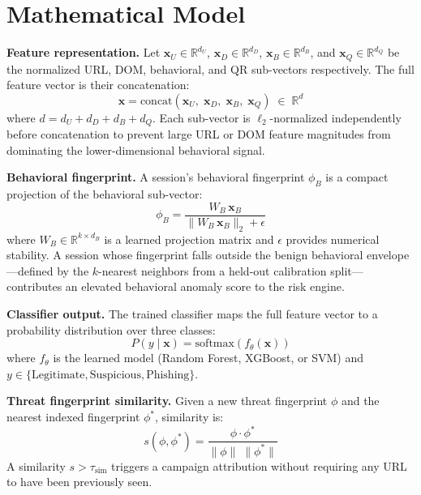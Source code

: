 \documentclass[conference]{IEEEtran}
\begin{document}
\section{Mathematical Model}

\noindent\textbf{Feature representation.}
Let $\mathbf{x}_U\in\mathbb{R}^{d_U}$, $\mathbf{x}_D\in\mathbb{R}^{d_D}$,
$\mathbf{x}_B\in\mathbb{R}^{d_B}$, and $\mathbf{x}_Q\in\mathbb{R}^{d_Q}$ be the normalized
URL, DOM, behavioral, and QR sub-vectors respectively.
The full feature vector is their concatenation:
\begin{equation}
  \mathbf{x} = \mathrm{concat}\!\left(\mathbf{x}_U,\;\mathbf{x}_D,\;\mathbf{x}_B,\;\mathbf{x}_Q\right)
  \;\in\;\mathbb{R}^{d}
  \label{eq:feat}
\end{equation}
where $d = d_U + d_D + d_B + d_Q$.
Each sub-vector is $\ell_2$-normalized independently before concatenation to prevent large URL or
DOM feature magnitudes from dominating the lower-dimensional behavioral signal.

\noindent\textbf{Behavioral fingerprint.}
A session's behavioral fingerprint $\phi_B$ is a compact projection of the behavioral sub-vector:
\begin{equation}
  \phi_B = \frac{W_B\,\mathbf{x}_B}{\|W_B\,\mathbf{x}_B\|_2 + \epsilon}
  \label{eq:finger}
\end{equation}
where $W_B\in\mathbb{R}^{k\times d_B}$ is a learned projection matrix and $\epsilon$ provides
numerical stability.
A session whose fingerprint falls outside the benign behavioral envelope---defined by the
$k$-nearest neighbors from a held-out calibration split---contributes an elevated behavioral
anomaly score to the risk engine.

\noindent\textbf{Classifier output.}
The trained classifier maps the full feature vector to a probability distribution over three classes:
\begin{equation}
  P(y\mid\mathbf{x}) = \mathrm{softmax}\!\left(f_\theta(\mathbf{x})\right)
  \label{eq:cls}
\end{equation}
where $f_\theta$ is the learned model (Random Forest, XGBoost, or SVM) and
$y\in\{\text{Legitimate},\text{Suspicious},\text{Phishing}\}$.

\noindent\textbf{Threat fingerprint similarity.}
Given a new threat fingerprint $\phi$ and the nearest indexed fingerprint $\phi^*$, similarity is:
\begin{equation}
  s(\phi,\phi^*) = \frac{\phi \cdot \phi^*}{\|\phi\|\;\|\phi^*\|}
  \label{eq:sim}
\end{equation}
A similarity $s > \tau_{\mathrm{sim}}$ triggers a campaign attribution without requiring any URL
to have been previously seen.
\end{document}
